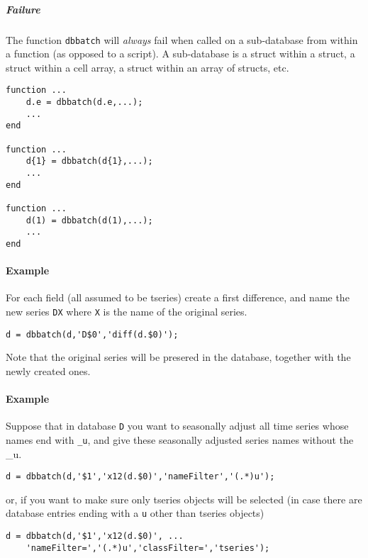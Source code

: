 \subparagraph{Failure}\label{failure}

The function \texttt{dbbatch} will \emph{always} fail when called on a
sub-database from within a function (as opposed to a script). A
sub-database is a struct within a struct, a struct within a cell array,
a struct within an array of structs, etc.

\begin{verbatim}
function ...
    d.e = dbbatch(d.e,...);
    ...
end

function ...
    d{1} = dbbatch(d{1},...);
    ...
end

function ...
    d(1) = dbbatch(d(1),...);
    ...
end
\end{verbatim}

\paragraph{Example}\label{example}

For each field (all assumed to be tseries) create a first difference,
and name the new series \texttt{DX} where \texttt{X} is the name of the
original series.

\begin{verbatim}
d = dbbatch(d,'D$0','diff(d.$0)');
\end{verbatim}

Note that the original series will be presered in the database, together
with the newly created ones.

\paragraph{Example}\label{example-1}

Suppose that in database \texttt{D} you want to seasonally adjust all
time series whose names end with \texttt{\_u}, and give these seasonally
adjusted series names without the \_u.

\begin{verbatim}
d = dbbatch(d,'$1','x12(d.$0)','nameFilter','(.*)u');
\end{verbatim}

or, if you want to make sure only tseries objects will be selected (in
case there are database entries ending with a \texttt{u} other than
tseries objects)

\begin{verbatim}
d = dbbatch(d,'$1','x12(d.$0)', ...
    'nameFilter=','(.*)u','classFilter=','tseries');
\end{verbatim}


